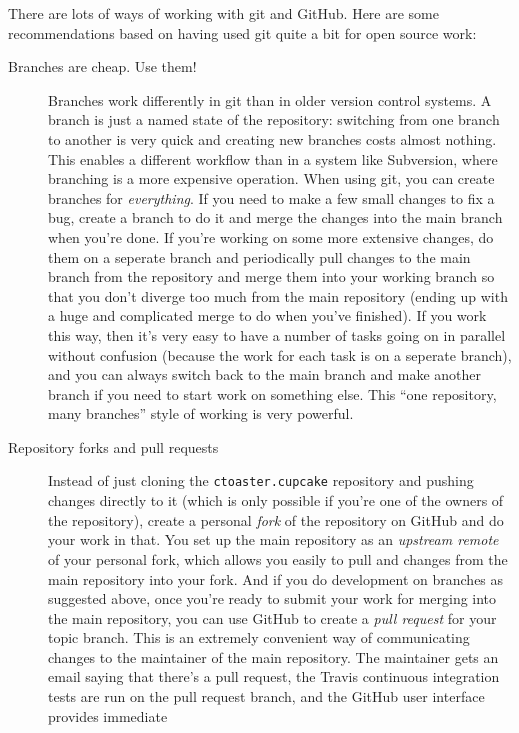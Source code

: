 \documentclass[a4paper,10pt,article]{memoir}
\begin{document}
There are lots of ways of working with git and GitHub.  Here are some
recommendations based on having used git quite a bit for open source
work:
\begin{description}
  \item[Branches are cheap.  Use them!]{Branches work differently in
    git than in older version control systems.  A branch is just a
    named state of the repository: switching from one branch to
    another is very quick and creating new branches costs almost
    nothing.  This enables a different workflow than in a system like
    Subversion, where branching is a more expensive operation.  When
    using git, you can create branches for \emph{everything}.  If you
    need to make a few small changes to fix a bug, create a branch to
    do it and merge the changes into the main branch when you're done.
    If you're working on some more extensive changes, do them on a
    seperate branch and periodically pull changes to the main branch
    from the repository and merge them into your working branch so
    that you don't diverge too much from the main repository (ending
    up with a huge and complicated merge to do when you've finished).
    If you work this way, then it's very easy to have a number of
    tasks going on in parallel without confusion (because the work for
    each task is on a seperate branch), and you can always switch back
    to the main branch and make another branch if you need to start
    work on something else.  This ``one repository, many branches''
    style of working is very powerful.}
  \item[Repository forks and pull requests]{Instead of just cloning
    the \texttt{ctoaster.cupcake} repository and pushing changes directly to it
    (which is only possible if you're one of the owners of the
    repository), create a personal \emph{fork} of the repository on
    GitHub and do your work in that.  You set up the main repository
    as an \emph{upstream remote} of your personal fork, which allows
    you easily to pull and changes from the main repository into your
    fork.  And if you do development on branches as suggested above,
    once you're ready to submit your work for merging into the main
    repository, you can use GitHub to create a \emph{pull request} for
    your topic branch.  This is an extremely convenient way of
    communicating changes to the maintainer of the main repository.
    The maintainer gets an email saying that there's a pull request,
    the Travis continuous integration tests are run on the pull
    request branch, and the GitHub user interface provides immediate
}
\end{description}
\end{document}
